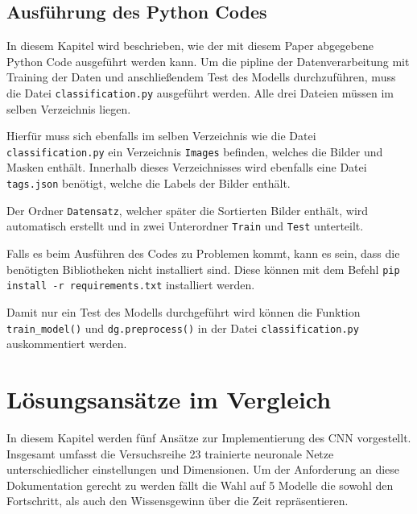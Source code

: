 \documentclass[journal,twoside,web]{ieeecolor}
\begin{document}
\subsection{Ausführung des Python Codes}

In diesem Kapitel wird beschrieben, wie der mit diesem Paper abgegebene Python Code ausgeführt werden kann.
Um die pipline der Datenverarbeitung mit Training der Daten und anschließendem Test des Modells durchzuführen, muss die Datei \texttt{classification.py} ausgeführt werden. Alle drei Dateien müssen im selben Verzeichnis liegen.

Hierfür muss sich ebenfalls im selben Verzeichnis wie die Datei \texttt{classification.py} ein Verzeichnis \texttt{Images} befinden, welches die Bilder und Masken enthält. Innerhalb dieses Verzeichnisses wird ebenfalls eine Datei \texttt{tags.json} benötigt, welche die Labels der Bilder enthält.

Der Ordner \texttt{Datensatz}, welcher später die Sortierten Bilder enthält, wird automatisch erstellt und in zwei Unterordner \texttt{Train} und \texttt{Test} unterteilt.

Falls es beim Ausführen des Codes zu Problemen kommt, kann es sein, dass die benötigten Bibliotheken nicht installiert sind. Diese können mit dem Befehl \texttt{pip install -r requirements.txt} installiert werden.

Damit nur ein Test des Modells durchgeführt wird können die Funktion \texttt{train\_model()} und \texttt{dg.preprocess()} in der Datei \texttt{classification.py} auskommentiert werden.


\section{Lösungsansätze im Vergleich}
In diesem Kapitel werden fünf Ansätze zur Implementierung des CNN vorgestellt. Insgesamt umfasst die Versuchsreihe 23 trainierte neuronale Netze unterschiedlicher einstellungen und Dimensionen.
Um der Anforderung an diese Dokumentation gerecht zu werden fällt die Wahl auf 5 Modelle die sowohl den Fortschritt, als auch den Wissensgewinn über die Zeit repräsentieren.
\end{document}
